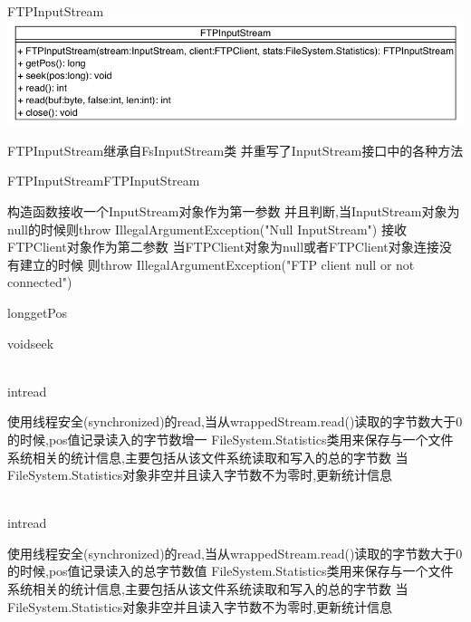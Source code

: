 \begin{XeClass}{FTPInputStream}
\includegraphics[width=\textwidth]{cdig/FTPInputStream.png}
     
 FTPInputStream继承自FsInputStream类
 并重写了InputStream接口中的各种方法

    \begin{XeMethod}{\XePublic}{FTPInputStream}{FTPInputStream}
         
 构造函数接收一个InputStream对象作为第一参数
 并且判断,当InputStream对象为null的时候则throw IllegalArgumentException("Null InputStream")
 接收FTPClient对象作为第二参数
 当FTPClient对象为null或者FTPClient对象连接没有建立的时候
 则throw IllegalArgumentException("FTP client null or not connected")

    \end{XeMethod}

    \begin{XeMethod}{\XePublic}{long}{getPos}
         

    \end{XeMethod}

    \begin{XeMethod}{\XePublic}{void}{seek}
         

    \end{XeMethod}

    \begin{XeMethod}{\XePublic \\ \XeSync}{int}{read}
         
 使用线程安全(synchronized)的read,当从wrappedStream.read()读取的字节数大于0的时候,pos值记录读入的字节数增一
 FileSystem.Statistics类用来保存与一个文件系统相关的统计信息,主要包括从该文件系统读取和写入的总的字节数
 当FileSystem.Statistics对象非空并且读入字节数不为零时,更新统计信息

    \end{XeMethod}

    \begin{XeMethod}{\XePublic \\ \XeSync}{int}{read}
         
 使用线程安全(synchronized)的read,当从wrappedStream.read()读取的字节数大于0的时候,pos值记录读入的总字节数值
 FileSystem.Statistics类用来保存与一个文件系统相关的统计信息,主要包括从该文件系统读取和写入的总的字节数
 当FileSystem.Statistics对象非空并且读入字节数不为零时,更新统计信息


\end{XeMethod}
\end{XeClass}
